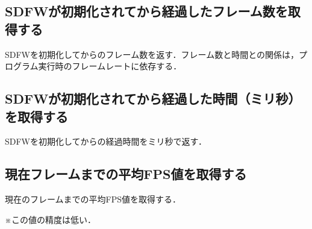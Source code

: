 \documentclass[a4paper, 11pt, oneside, onecolumn, openany]{jsarticle}
\begin{document}
\subsection{SDFWが初期化されてから経過したフレーム数を取得する}
SDFWを初期化してからのフレーム数を返す．フレーム数と時間との関係は，プログラム実行時のフレームレートに依存する．

\subsection{SDFWが初期化されてから経過した時間（ミリ秒）を取得する}
SDFWを初期化してからの経過時間をミリ秒で返す．

\subsection{現在フレームまでの平均FPS値を取得する}
現在のフレームまでの平均FPS値を取得する．\par
※この値の精度は低い．
\end{document}
